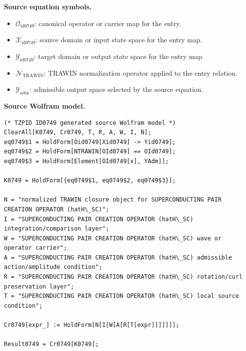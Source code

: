 \begin{minipage}[t]{0.49\linewidth}
\begingroup
\small
\raggedright
\textbf{Source equation symbols.}\par
\begin{itemize}[leftmargin=1.35em,itemsep=1pt,topsep=1pt,parsep=0pt]
    \item $\mathcal{O}_{\mathrm{id0749}}$: canonical operator or carrier map for the entry.
    \item $\mathcal{X}_{\mathrm{id0749}}$: source domain or input state space for the entry map.
    \item $\mathcal{Y}_{\mathrm{id0749}}$: target domain or output state space for the entry map.
    \item $\mathcal{N}_{\mathrm{TRAWIN}}$: TRAWIN normalization operator applied to the entry relation.
    \item $\mathcal{Y}_{\mathrm{adm}}$: admissible output space selected by the source equation.
\end{itemize}
\endgroup
\end{minipage}\hfill
\begin{minipage}[t]{0.47\linewidth}
\begingroup
\scriptsize
\raggedright
\textbf{Source Wolfram model.}\par
\begin{Verbatim}[fontsize=\tiny,breaklines=true,breakanywhere=true]
(* TZPID ID0749 generated source Wolfram model *)
ClearAll[K0749, Cr0749, T, R, A, W, I, N];
eq0749$1 = HoldForm[Oid0749[Xid0749] -> Yid0749];
eq0749$2 = HoldForm[NTRAWIN[OId0749] == OId0749];
eq0749$3 = HoldForm[Element[OId0749[x], YAdm]];

K0749 = HoldForm[{eq0749$1, eq0749$2, eq0749$3}];

N = "normalized TRAWIN closure object for SUPERCONDUCTING PAIR CREATION OPERATOR (hatH\_SC)";
I = "SUPERCONDUCTING PAIR CREATION OPERATOR (hatH\_SC) integration/comparison layer";
W = "SUPERCONDUCTING PAIR CREATION OPERATOR (hatH\_SC) wave or operator carrier";
A = "SUPERCONDUCTING PAIR CREATION OPERATOR (hatH\_SC) admissible action/amplitude condition";
R = "SUPERCONDUCTING PAIR CREATION OPERATOR (hatH\_SC) rotation/curl preservation layer";
T = "SUPERCONDUCTING PAIR CREATION OPERATOR (hatH\_SC) local source condition";

Cr0749[expr_] := HoldForm[N[I[W[A[R[T[expr]]]]]]];

Result0749 = Cr0749[K0749];
\end{Verbatim}
\endgroup
\end{minipage}

